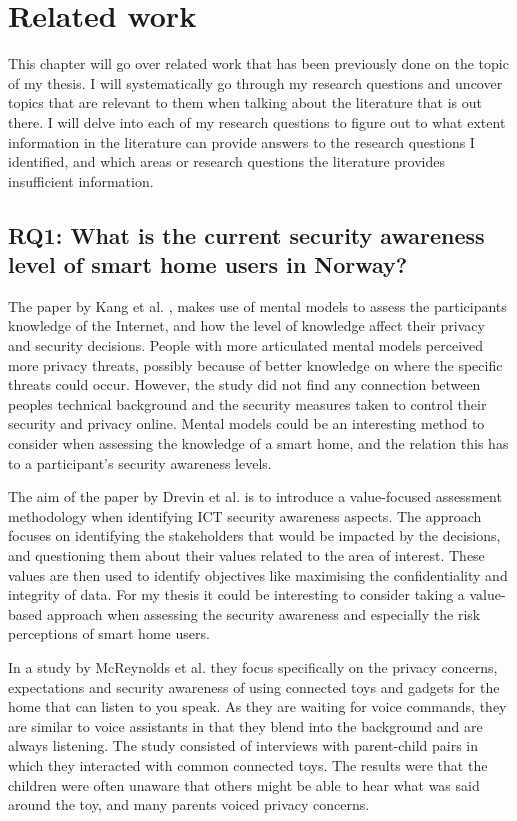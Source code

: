 \chapter{Related work}
\label{chap:related_work}
This chapter will go over related work that has been previously done on the topic of my thesis. I will systematically go through my research questions and uncover topics that are relevant to them when talking about the literature that is out there. I will delve into each of my research questions to figure out to what extent information in the literature can provide answers to the research questions I identified, and which areas or research questions the literature provides insufficient information.

\section{RQ1: What is the current security awareness level of smart home users in Norway?}
The paper by Kang et al. \cite{Kang2015}, makes use of mental models to assess the participants knowledge of the Internet, and how the level of knowledge affect their privacy and security decisions. People with more articulated mental models perceived more privacy threats, possibly because of better knowledge on where the specific threats could occur. However, the study did not find any connection between peoples technical background and the security measures taken to control their security and privacy online. Mental models could be an interesting method to consider when assessing the knowledge of a smart home, and the relation this has to a participant's security awareness levels. 

The aim of the paper by Drevin et al. \cite{Drevin2006} is to introduce a value-focused assessment methodology when identifying ICT security awareness aspects. The approach focuses on identifying the stakeholders that would be impacted by the decisions, and questioning them about their values related to the area of interest. These values are then used to identify objectives like maximising the confidentiality and integrity of data. For my thesis it could be interesting to consider taking a value-based approach when assessing the security awareness and especially the risk perceptions of smart home users. 

In a study by McReynolds et al. \cite{McReynolds:2017:TLS:3025453.3025735} they focus specifically on the privacy concerns, expectations and security awareness of using connected toys and gadgets for the home that can listen to you speak. As they are waiting for voice commands, they are similar to voice assistants in that they blend into the background and are always listening. The study consisted of interviews with parent-child pairs in which they interacted with common connected toys. The results were that the children were often unaware that others might be able to hear what was said around the toy, and many parents voiced privacy concerns. 

